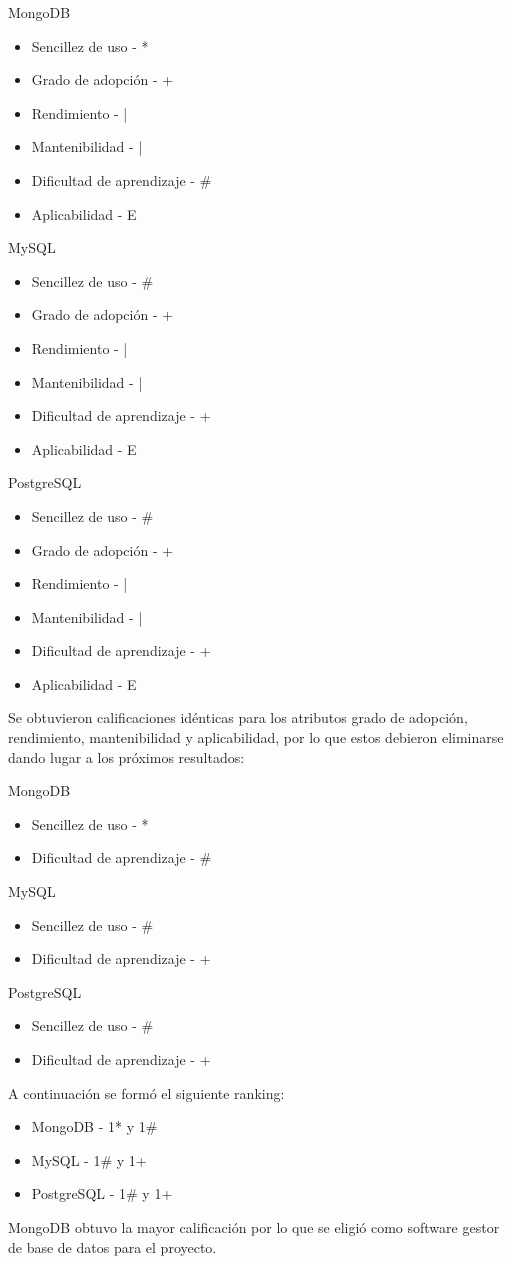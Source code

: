 \documentclass{article}
\begin{document}
MongoDB
\begin{itemize}
    \item Sencillez de uso - *
    \item Grado de adopción - +
    \item Rendimiento - |
    \item Mantenibilidad - |
    \item Dificultad de aprendizaje - \#
    \item Aplicabilidad - E
\end{itemize}
MySQL
\begin{itemize}
    \item Sencillez de uso - \#
    \item Grado de adopción - +
    \item Rendimiento - |
    \item Mantenibilidad - |
    \item Dificultad de aprendizaje - +
    \item Aplicabilidad - E
\end{itemize}
PostgreSQL
\begin{itemize}
    \item Sencillez de uso - \#
    \item Grado de adopción - +
    \item Rendimiento - |
    \item Mantenibilidad - |
    \item Dificultad de aprendizaje - +
    \item Aplicabilidad - E
\end{itemize}
Se obtuvieron calificaciones idénticas para los atributos grado de adopción, rendimiento, mantenibilidad y aplicabilidad, por lo que estos debieron eliminarse dando lugar a los próximos resultados:

MongoDB
\begin{itemize}
    \item Sencillez de uso - *
    \item Dificultad de aprendizaje - \#
\end{itemize}
MySQL
\begin{itemize}
    \item Sencillez de uso - \#
    \item Dificultad de aprendizaje - +
\end{itemize}
PostgreSQL
\begin{itemize}
    \item Sencillez de uso - \#
    \item Dificultad de aprendizaje - +
\end{itemize}
A continuación se formó el siguiente ranking:
\begin{itemize}
    \item MongoDB - 1* y 1\#
    \item MySQL - 1\# y 1+
    \item PostgreSQL - 1\# y 1+
\end{itemize}
MongoDB obtuvo la mayor calificación por lo que se eligió como software gestor de base de datos para el proyecto.
\end{document}
